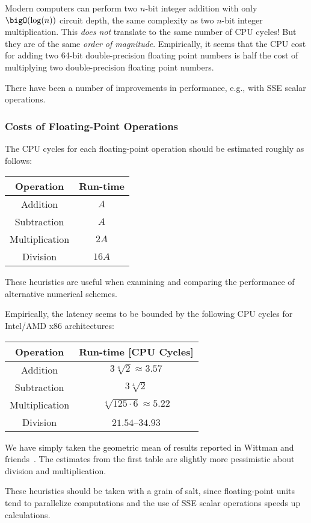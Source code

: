 \begin{rmk}
  Modern computers can perform two $n$-bit integer addition with only
  $\bigO(\log(n))$ circuit depth, the same complexity as two $n$-bit
  integer multiplication. This \emph{does not} translate to the same
  number of CPU cycles! But they are of the same \emph{order of magnitude}.
  Empirically, it seems that the CPU cost for adding two 64-bit
  double-precision floating point numbers is half the cost of multiplying two
  double-precision floating point numbers.

  There have been a number of improvements in performance, e.g., with
  SSE scalar operations.
\end{rmk}
\subsubsection{Costs of Floating-Point Operations}
\begin{heuristic}
  The CPU cycles for each floating-point operation should be estimated
  roughly as follows:
  \begin{center}
  \begin{tabular}{c|c}
    Operation & Run-time\\\hline
    Addition & $A$ \\
    Subtraction & $A$ \\
    Multiplication & $2A$ \\
    Division & $16A$
  \end{tabular}
  \end{center}
  These heuristics are useful when examining and comparing the
  performance of alternative numerical schemes.
\end{heuristic}
\begin{ex}
  Empirically, the latency seems to be bounded by the following CPU
  cycles for Intel/AMD x86 architectures:
  \begin{center}
  \begin{tabular}{c|c}
    Operation & Run-time [CPU Cycles]\\\hline
    Addition & $3 \sqrt[4]{2}\approx 3.57$ \\
    Subtraction &  $3\sqrt[4]{2}$ \\
    Multiplication & $\sqrt[4]{125\cdot 6}\approx5.22$ \\
    Division & $21.54$--$34.93$
  \end{tabular}
  \end{center}
  We have simply taken the geometric mean of results reported in Wittman
  and friends~\cite{DBLP:journals/corr/WittmannZHW15}. The estimates
  from the first table are slightly more pessimistic about division and
  multiplication.

  These heuristics should be taken with a grain of salt, since
  floating-point units tend to parallelize computations and the use of
  SSE scalar operations speeds up calculations.
\end{ex}
